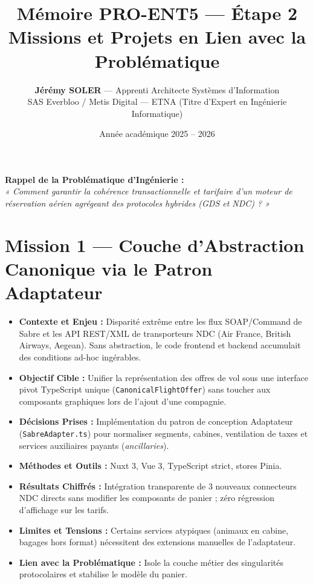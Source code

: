 \documentclass[11pt,a4paper]{article}
\title{\vspace{-1cm}\Huge\textbf{\textcolor{NavyBlue}{Mémoire PRO-ENT5 — Étape 2}}\\[6pt]
\Large\textbf{\textcolor{CobaltBlue}{Missions et Projets en Lien avec la Problématique}}}
\author{\textbf{Jérémy SOLER} — Apprenti Architecte Systèmes d'Information\\
SAS Everbloo / Metis Digital — ETNA (Titre d'Expert en Ingénierie Informatique)}
\date{Année académique 2025 -- 2026}
\begin{document}
\maketitle

\vspace{0.2cm}
\begin{tcolorbox}[colback=LightGray, colframe=NavyBlue, arc=4pt, boxrule=1.1pt]
\centering\textbf{Rappel de la Problématique d'Ingénierie :}\\
\textit{« Comment garantir la cohérence transactionnelle et tarifaire d'un moteur de réservation aérien agrégeant des protocoles hybrides (GDS et NDC) ? »}
\end{tcolorbox}

\section{Mission 1 — Couche d'Abstraction Canonique via le Patron Adaptateur}
\begin{itemize}[itemsep=2pt]
    \item \textbf{Contexte et Enjeu :} Disparité extrême entre les flux SOAP/Command de Sabre et les API REST/XML de transporteurs NDC (Air France, British Airways, Aegean). Sans abstraction, le code frontend et backend accumulait des conditions ad-hoc ingérables.
    \item \textbf{Objectif Cible :} Unifier la représentation des offres de vol sous une interface pivot TypeScript unique (\texttt{CanonicalFlightOffer}) sans toucher aux composants graphiques lors de l'ajout d'une compagnie.
    \item \textbf{Décisions Prises :} Implémentation du patron de conception Adaptateur (\texttt{SabreAdapter.ts}) pour normaliser segments, cabines, ventilation de taxes et services auxiliaires payants (\textit{ancillaries}).
    \item \textbf{Méthodes et Outils :} Nuxt 3, Vue 3, TypeScript strict, stores Pinia.
    \item \textbf{Résultats Chiffrés :} Intégration transparente de 3 nouveaux connecteurs NDC directs sans modifier les composants de panier ; zéro régression d'affichage sur les tarifs.
    \item \textbf{Limites et Tensions :} Certains services atypiques (animaux en cabine, bagages hors format) nécessitent des extensions manuelles de l'adaptateur.
    \item \textbf{Lien avec la Problématique :} Isole la couche métier des singularités protocolaires et stabilise le modèle du panier.
\end{itemize}
\end{document}
